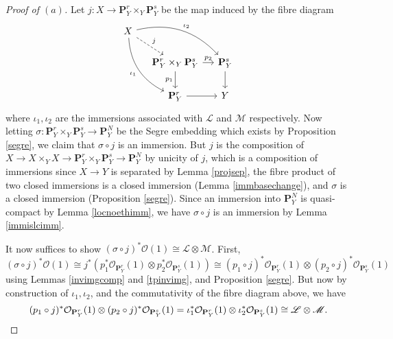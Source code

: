\documentclass[10pt]{article}
\theoremstyle{definition}
\theoremstyle{remark}
\numberwithin{equation}{section}
\numberwithin{figure}{subsubsection}
\newcommand{\LL}{\mathscr{L}}
\newcommand{\MM}{\mathscr{M}}
\newcommand{\OO}{\mathcal{O}}
\begin{document}
\begin{proof}[Proof of $(a)$]
  Let $j\colon X \to \mathbf{P}^r_Y \times_Y \mathbf{P}^s_Y$ be the map induced by the fibre diagram
  \begin{equation*}
    \begin{tikzcd}[column sep=small]
      X\arrow[dashed]{dr}{j}\arrow[bend right]{ddr}[swap]{\iota_1}\arrow[bend left]{drr}{\iota_2}\\
      & \mathbf{P}^r_Y \times_Y \mathbf{P}^s_Y \rar{p_2}\dar[swap]{p_1} & \mathbf{P}^s_Y\dar\\
      & \mathbf{P}^r_Y \rar & Y
    \end{tikzcd}
  \end{equation*}
  where $\iota_1,\iota_2$ are the immersions associated with $\LL$ and $\MM$ respectively. Now letting $\sigma\colon \mathbf{P}^r_Y \times_Y \mathbf{P}^s_Y \to \mathbf{P}^N_Y$ be the Segre embedding which exists by Proposition \ref{segre}, we claim that $\sigma \circ j$ is an immersion. But $j$ is the composition of $X \to X \times_Y X \to \mathbf{P}^r_Y \times_Y \mathbf{P}^s_Y \to \mathbf{P}^N_Y$ by unicity of $j$, which is a composition of immersions since $X \to Y$ is separated by Lemma \ref{projsep}, the fibre product of two closed immersions is a closed immersion (Lemma \ref{immbasechange}), and $\sigma$ is a closed immersion (Proposition \ref{segre}). Since an immersion into $\mathbf{P}_Y^N$ is quasi-compact by Lemma \ref{locnoethimm}, we have $\sigma \circ j$ is an immersion by Lemma \ref{immislcimm}.
  \par It now suffices to show $(\sigma \circ j)^*\OO(1) \cong \LL \otimes \MM$. First,
  \begin{equation*}
    (\sigma \circ j)^*\OO(1) \cong j^*(p_1^*\OO_{\mathbf{P}^r_Y}(1) \otimes p_2^*\OO_{\mathbf{P}^s_Y}(1)) \cong (p_1 \circ j)^*\OO_{\mathbf{P}^r_Y}(1) \otimes (p_2 \circ j)^*\OO_{\mathbf{P}^s_Y}(1)
  \end{equation*}
  using Lemmas \ref{invimgcomp} and \ref{tpinvimg}, and Proposition \ref{segre}. But now by construction of $\iota_1,\iota_2$, and the commutativity of the fibre diagram above, we have
  \begin{equation*}
    (p_1 \circ j)^*\OO_{\mathbf{P}^r_Y}(1) \otimes (p_2 \circ j)^*\OO_{\mathbf{P}^s_Y}(1) = \iota_1^*\OO_{\mathbf{P}^r_Y}(1) \otimes \iota_2^*\OO_{\mathbf{P}^s_Y}(1) \cong \LL \otimes \MM.\qedhere
  \end{equation*}
\end{proof}
\end{document}
